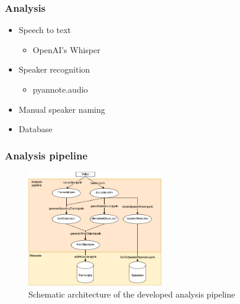 \documentclass[aspectratio=169,sidebar]{uva-inf-presentation}
\begin{document}


\begin{frame}\frametitle{Analysis}
\begin{itemize}
    \item Speech to text
    \begin{itemize}
        \item OpenAI's Whisper
    \end{itemize}
    \item Speaker recognition
    \begin{itemize}
        \item pyannote.audio
    \end{itemize}
    \item Manual speaker naming
    \item Database
\end{itemize}
\end{frame}

\begin{frame}\frametitle{Analysis pipeline}
\begin{figure}
    \centering
    \includegraphics[width=0.53\textwidth]{images/pipeline.png}
    \caption{Schematic architecture of the developed analysis pipeline}
    \label{fig:pipeline}
\end{figure}
\end{frame}
\end{document}
